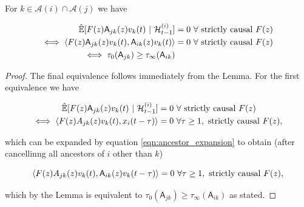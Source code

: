 \documentclass[12pt]{article}
\def\A{\mathsf{A}}  %
\def\H{\mathcal{H}}  %
\newcommand{\linE}[2]{\hat{\E}[#1\ |\ #2]}  %
\newcommand{\anc}[1]{\mathcal{A}(#1)}  %
\begin{document}
\begin{corollary}
  \label{cor:time_lag_cancellation}
  For $k \in \anc{i} \cap \anc{j}$ we have

  \begin{align*}
    \linE{F(z)\A_{jk}(z)v_k(t)}{\H_{t - 1}^{(i)}} &= 0\ \forall \text{ strictly causal } F(z)\\
    \iff \inner{F(z)\A_{jk}(z)v_k(t)}{\A_{ik}(z)v_k(t)} &= 0\ \forall \text{ strictly causal } F(z)\\
    \iff \tau_0(\A_{jk}) \ge \tau_\infty(\A_{ik})
  \end{align*}
\end{corollary}
\begin{proof}
  The final equivalence follows immediately from the Lemma.  For the first equivalence we have

  \begin{align*}
    \linE{F(z)\A_{jk}(z)v_k(t)}{\H_{t - 1}^{(i)}} &= 0\ \forall \text{ strictly causal } F(z)\\
    \iff \inner{F(z)A_{jk}(z)v_k(t)}{x_i(t - \tau)} &= 0\ \forall \tau \ge 1, \text{ strictly causal } F(z),
  \end{align*}

  which can be expanded by equation \eqref{eqn:ancestor_expansion} to
  obtain (after cancellinng all ancestors of $i$ other than $k$)

  \begin{equation*}
    \inner{F(z)A_{jk}(z)v_k(t)}{\A_{ik}(z)v_k(t - \tau)} = 0\ \forall \tau \ge 1, \text{ strictly causal } F(z),
  \end{equation*}

  which by the Lemma is equivalent to $\tau_0(\A_{jk}) \ge \tau_\infty(\A_{ik})$ as stated.
\end{proof}
\end{document}
